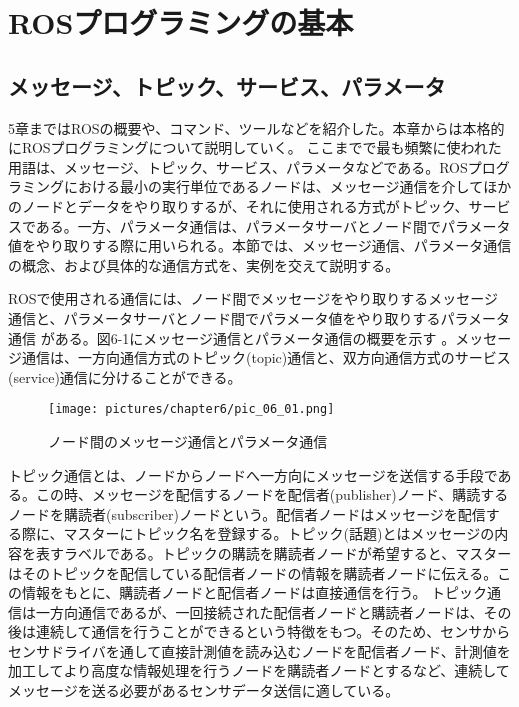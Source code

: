
\chapter{ROSプログラミングの基本}

\section{メッセージ、トピック、サービス、パラメータ}

5章まではROSの概要や、コマンド、ツールなどを紹介した。本章からは本格的にROSプログラミングについて説明していく。
ここまでで最も頻繁に使われた用語は、メッセージ、トピック、サービス、パラメータなどである。ROSプログラミングにおける最小の実行単位であるノードは、メッセージ通信を介してほかのノードとデータをやり取りするが、それに使用される方式がトピック、サービスである。一方、パラメータ通信は、パラメータサーバとノード間でパラメータ値をやり取りする際に用いられる。本節では、メッセージ通信、パラメータ通信の概念、および具体的な通信方式を、実例を交えて説明する。

\begin{definition*}[ROSで使用される通信]
ROSで使用される通信には、ノード間でメッセージをやり取りするメッセージ通信と、パラメータサーバとノード間でパラメータ値をやり取りするパラメータ通信    がある。図6-1にメッセージ通信とパラメータ通信の概要を示す 。メッセージ通信は、一方向通信方式のトピック(topic)通信と、双方向通信方式のサービス(service)通信に分けることができる。
\end{definition*}

\begin{figure}[h]
  \centering
  \texttt{[image: pictures/chapter6/pic\_06\_01.png]}
  \caption{ノード間のメッセージ通信とパラメータ通信}
\end{figure}

\begin{definition*}
トピック通信とは、ノードからノードへ一方向にメッセージを送信する手段である。この時、メッセージを配信するノードを配信者(publisher)ノード、購読するノードを購読者(subscriber)ノードという。配信者ノードはメッセージを配信する際に、マスターにトピック名を登録する。トピック(話題)とはメッセージの内容を表すラベルである。トピックの購読を購読者ノードが希望すると、マスターはそのトピックを配信している配信者ノードの情報を購読者ノードに伝える。この情報をもとに、購読者ノードと配信者ノードは直接通信を行う。
トピック通信は一方向通信であるが、一回接続された配信者ノードと購読者ノードは、その後は連続して通信を行うことができるという特徴をもつ。そのため、センサからセンサドライバを通して直接計測値を読み込むノードを配信者ノード、計測値を加工してより高度な情報処理を行うノードを購読者ノードとするなど、連続してメッセージを送る必要があるセンサデータ送信に適している。
\end{definition*}


